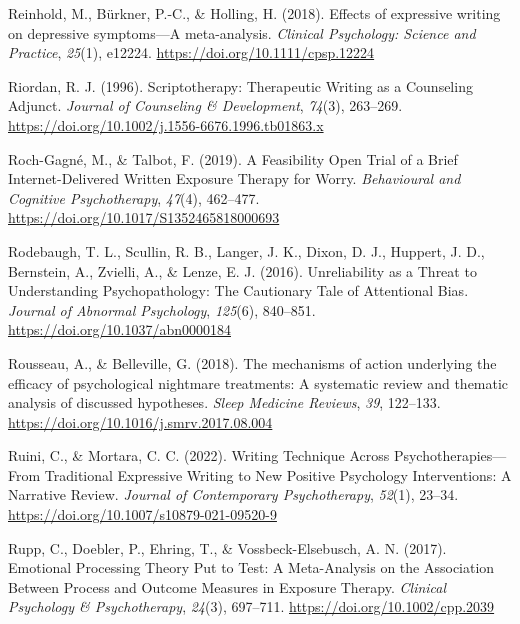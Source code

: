 \documentclass[
  man,floatsintext]{apa7}
\newlength{\cslhangindent}
\newlength{\cslentryspacingunit} %
\newenvironment{CSLReferences}[2] %
 {%
  \setlength{\parindent}{0pt}
  \ifodd #1
  \let\oldpar\par
  \def\par{\hangindent=\cslhangindent\oldpar}
  \fi
  \setlength{\parskip}{#2\cslentryspacingunit}
 }%
 {}
\begin{document}
\begin{CSLReferences}{1}{0}
\leavevmode{}%
Reinhold, M., Bürkner, P.-C., \& Holling, H. (2018). Effects of expressive writing on depressive symptoms---A meta-analysis. \emph{Clinical Psychology: Science and Practice}, \emph{25}(1), e12224. \url{https://doi.org/10.1111/cpsp.12224}

\leavevmode{}%
Riordan, R. J. (1996). Scriptotherapy: Therapeutic Writing as a Counseling Adjunct. \emph{Journal of Counseling \& Development}, \emph{74}(3), 263--269. \url{https://doi.org/10.1002/j.1556-6676.1996.tb01863.x}

\leavevmode{}%
Roch-Gagné, M., \& Talbot, F. (2019). A Feasibility Open Trial of a Brief Internet-Delivered Written Exposure Therapy for Worry. \emph{Behavioural and Cognitive Psychotherapy}, \emph{47}(4), 462--477. \url{https://doi.org/10.1017/S1352465818000693}

\leavevmode{}%
Rodebaugh, T. L., Scullin, R. B., Langer, J. K., Dixon, D. J., Huppert, J. D., Bernstein, A., Zvielli, A., \& Lenze, E. J. (2016). Unreliability as a Threat to Understanding Psychopathology: The Cautionary Tale of Attentional Bias. \emph{Journal of Abnormal Psychology}, \emph{125}(6), 840--851. \url{https://doi.org/10.1037/abn0000184}

\leavevmode{}%
Rousseau, A., \& Belleville, G. (2018). The mechanisms of action underlying the efficacy of psychological nightmare treatments: A systematic review and thematic analysis of discussed hypotheses. \emph{Sleep Medicine Reviews}, \emph{39}, 122--133. \url{https://doi.org/10.1016/j.smrv.2017.08.004}

\leavevmode{}%
Ruini, C., \& Mortara, C. C. (2022). Writing Technique Across Psychotherapies---From Traditional Expressive Writing to New Positive Psychology Interventions: A Narrative Review. \emph{Journal of Contemporary Psychotherapy}, \emph{52}(1), 23--34. \url{https://doi.org/10.1007/s10879-021-09520-9}

\leavevmode{}%
Rupp, C., Doebler, P., Ehring, T., \& Vossbeck-Elsebusch, A. N. (2017). Emotional Processing Theory Put to Test: A Meta-Analysis on the Association Between Process and Outcome Measures in Exposure Therapy. \emph{Clinical Psychology \& Psychotherapy}, \emph{24}(3), 697--711. \url{https://doi.org/10.1002/cpp.2039}


\end{CSLReferences}
\end{document}
